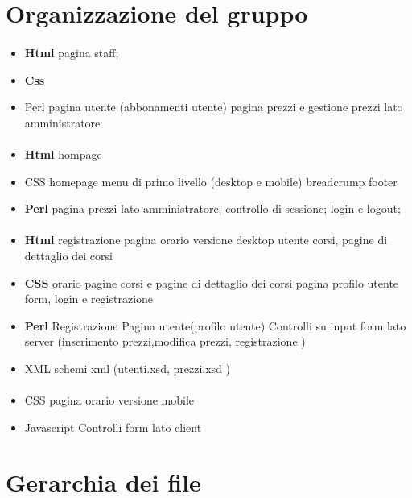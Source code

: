 \documentclass[12pt,a4paper]{article}
\begin{document}
\section{Organizzazione del gruppo}
\paragraph{\TF{}}
\begin{itemize}
	\item \textbf{Html}
	\subitem pagina staff;
	\item \textbf{Css}
	\item{Perl}
	\subitem pagina utente (abbonamenti utente)
	\subitem pagina prezzi e gestione prezzi lato amministratore
	
	
\end{itemize}
\paragraph{\LB{}}
\begin{itemize}
	\item \textbf{Html}
	\subitem hompage
	\item{CSS}
	\subitem homepage
	\subitem menu di primo livello (desktop e mobile)
	\subitem breadcrump
	\subitem footer
	\item \textbf{Perl}
	\subitem pagina prezzi lato amministratore;
	\subitem controllo di sessione;
	\subitem login e logout;
\end{itemize}
\paragraph{\AB{}}
\begin{itemize}
	\item \textbf{Html}
	\subitem registrazione
	\subitem pagina orario versione desktop
	\subitem utente
	\subitem corsi, pagine di dettaglio dei corsi
	\item \textbf{CSS}
	\subitem orario
	\subitem pagine corsi e pagine di dettaglio dei corsi
	\subitem pagina profilo utente
	\subitem form, login e registrazione
	\item \textbf{Perl}
	\subitem Registrazione
	\subitem Pagina utente(profilo utente)
	\subitem Controlli su input form lato server (inserimento prezzi,modifica prezzi, registrazione )
	\item{XML}
	\subitem schemi xml (utenti.xsd, prezzi.xsd )
\end{itemize}
\paragraph{\EC{}}
\begin{itemize}
	\item{CSS}
	\subitem pagina orario versione mobile
	\item{Javascript}
	\subitem Controlli form lato client
\end{itemize}

\section{Gerarchia dei file}
\end{document}
